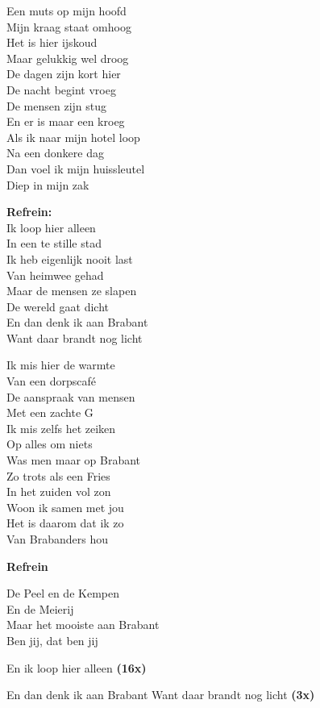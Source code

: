 Een muts op mijn hoofd\\
Mijn kraag staat omhoog\\
Het is hier ijskoud\\
Maar gelukkig wel droog\\
De dagen zijn kort hier\\
De nacht begint vroeg\\
De mensen zijn stug\\
En er is maar een kroeg\\
Als ik naar mijn hotel loop\\
Na een donkere dag\\
Dan voel ik mijn huissleutel\\
Diep in mijn zak

\textbf{Refrein:}\\
Ik loop hier alleen\\
In een te stille stad\\
Ik heb eigenlijk nooit last\\
Van heimwee gehad\\
Maar de mensen ze slapen\\
De wereld gaat dicht\\
En dan denk ik aan Brabant\\
Want daar brandt nog licht

Ik mis hier de warmte\\
Van een dorpscafé\\
De aanspraak van mensen\\
Met een zachte G\\
Ik mis zelfs het zeiken\\
Op alles om niets\\
Was men maar op Brabant\\
Zo trots als een Fries\\
In het zuiden vol zon\\
Woon ik samen met jou\\
Het is daarom dat ik zo\\
Van Brabanders hou

\textbf{Refrein}

De Peel en de Kempen\\
En de Meierij\\
Maar het mooiste aan Brabant\\
Ben jij, dat ben jij

En ik loop hier alleen \textbf{(16x)}

En dan denk ik aan Brabant Want daar brandt nog licht \textbf{(3x)}
